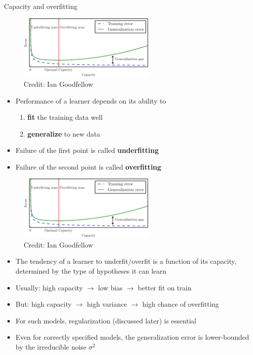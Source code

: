 \documentclass[11pt,compress,t,notes=noshow, xcolor=table]{beamer}
\begin{document}
\begin{vbframe}{Capacity and overfitting}

  \begin{figure}
    \centering
    \includegraphics[width = 0.6\textwidth]{figure_man/lcurve_1.png}
    \tiny{\\ Credit: Ian Goodfellow}
  \end{figure}
  

\begin{itemize}
  \item Performance of a learner depends on its ability to 
    \begin{enumerate}
      \item \textbf{fit} the training data well
      \item \textbf{generalize} to new data
    \end{enumerate}  
  \item Failure of the first point is called \textbf{underfitting}
  \item Failure of the second point is called \textbf{overfitting}
\end{itemize}  


\framebreak

\begin{figure}
  \centering
  \includegraphics[width = 0.6\textwidth]{figure_man/lcurve_1.png}
  \tiny{\\ Credit: Ian Goodfellow}
\end{figure}


\begin{itemize}
  \item The tendency of a learner to underfit/overfit is a function of its capacity, determined by the type of hypotheses it can learn
  \item Usually: high capacity $\rightarrow$ low bias $\rightarrow$ better fit on train
  \item But: high capacity $\rightarrow$ high variance $\rightarrow$ high chance of overfitting
  \item For such models, regularization (discussed later) is essential
  \item Even for correctly specified models, the generalization error is lower-bounded by the irreducible noise $\sigma^2$
\end{itemize}
\end{vbframe}

\endlecture
\end{document}
